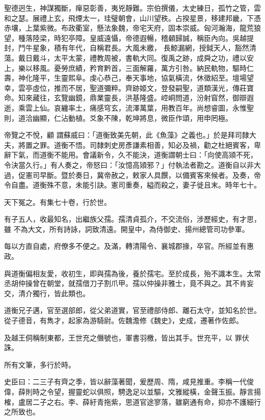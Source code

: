 \begin{pinyinscope}
 聖德迥生，神謀獨斷，癉惡彰善，夷兇靜難。宗伯撰儀，太史練日，孤竹之管，雲和之瑟。展禮上玄，飛煙太一，珪璧朝會，山川望秩。占揆星景，移建邦畿，下憑赤壤，上葉紫微。布政衢室，懸法象魏，帝宅天府，固本崇威。匈河瀚海，龍荒狼望，種落陸梁，時犯亭障。皇威遠懾，帝德遐暢，稽顙歸誠，稱臣內向。吳越提封，鬥牛星象，積有年代，自稱君長。大風未繳，
 長鯨漏網，授鉞天人，豁然清蕩。戴日戴斗，太平太蒙，禮教周被，書軌大同。復禹之跡，成舜之功，禮以安上，樂以移風。憂勞庶績，矜育黔首，三面解羅，萬方引咎。納民軌物，驅時仁壽，神化隆平，生靈熙阜。虔心恭己，奉天事地，協氣橫流，休徵紹至。壇場望幸，雲亭虛位，推而不居，聖道彌粹。齊跡姬文，登發嗣聖，道類漢光，傳莊寶命。知來藏往，玄覽幽鏡，鼎業靈長，洪基隆盛。崆峒問道，汾射窅然，御辯遐逝，乘雲上仙。哀纏率土，痛感穹玄，流澤萬葉，用教百年。尚想睿圖，永惟聖則，道洽幽顯，仁沾動植。爻象不陳，乾坤將息，微臣作頌，用申罔極。



 帝覽之不悅，顧
 謂蘇威曰：「道衡致美先朝，此《魚藻》之義也。」於是拜司隸大夫，將置之罪。道衡不悟。司隸刺史房彥謙素相善，知必及禍，勸之杜絕賓客，卑辭下氣，而道衡不能用。會議新令，久不能決，道衡謂朝士曰：「向使高熲不死，令決當久行。」有人奏之，帝怒曰：「汝憶高熲邪？」付執法者勘之。道衡自以非大過，促憲司早斷。暨於奏日，冀帝赦之，敕家人具饌，以備賓客來候者。及奏，帝令自盡。道衡殊不意，未能引訣。憲司重奏，縊而殺之，妻子徙且末。時年七十。



 天下冤之。有集七十卷，行於世。



 有子五人，收最知名，出繼族父孺。孺清貞孤介，不交流俗，涉歷經史，有才思，雖
 不為大文，所有詩詠，詞致清遠。開皇中，為侍御史、揚州總管司功參軍。



 每以方直自處，府僚多不便之。及滿，轉清陽令、襄城郡掾，卒官。所經並有惠政。



 與道衡偏相友愛，收初生，即與孺為後，養於孺宅。至於成長，殆不識本生。太常丞胡仲操曾在朝堂，就孺借刀子割爪甲。孺以仲操非雅士，竟不與之。其不肯妄交，清介獨行，皆此類也。



 道衡兄子邁，官至選部郎，從父弟道實，官至禮部侍郎、離石太守，並知名於世。從子德音，有雋才，起家為游騎尉。佐魏澹修《魏史》，史成，遷著作佐郎。



 及越王侗稱制東都，王世充之僭號也，軍書羽檄，皆出其手。世充平，以
 罪伏誅。



 所有文筆，多行於時。



 史臣曰：二三子有齊之季，皆以辭藻著聞，爰歷周、隋，咸見推重。李稱一代俊偉，薛則時之令望，握靈蛇以俱照，騁逸足以並驅，文雅縱橫，金聲玉振。靜言揚榷，盧居二子之右。李、薛紆青拖紫，思道官途寥落，雖窮通有命，抑亦不護細行之所致也。



\end{pinyinscope}